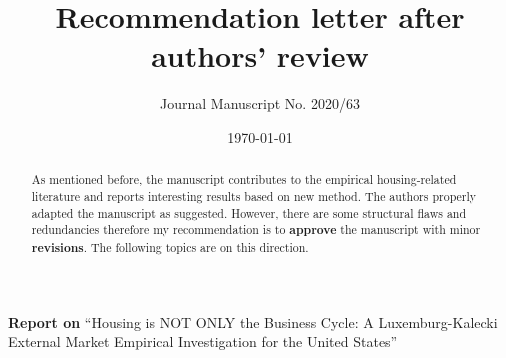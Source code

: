 \documentclass[11pt]{article}
\author{Journal Manuscript No. 2020/63}
\date{\today}
\title{Recommendation letter after authors' review}
\begin{document}
\maketitle
\noindent \textbf{Report on} ``Housing is NOT ONLY the Business Cycle: A Luxemburg-Kalecki External Market Empirical Investigation for the United States'' 


\begin{abstract}
As mentioned before, the manuscript contributes to the empirical housing-related literature and reports interesting results based on new method.
The authors properly adapted the manuscript as suggested.
However, there are some structural flaws and redundancies therefore my recommendation is to \textbf{approve} the manuscript with minor \textbf{revisions}.
The following topics are on this direction.
\end{abstract}
\end{document}

